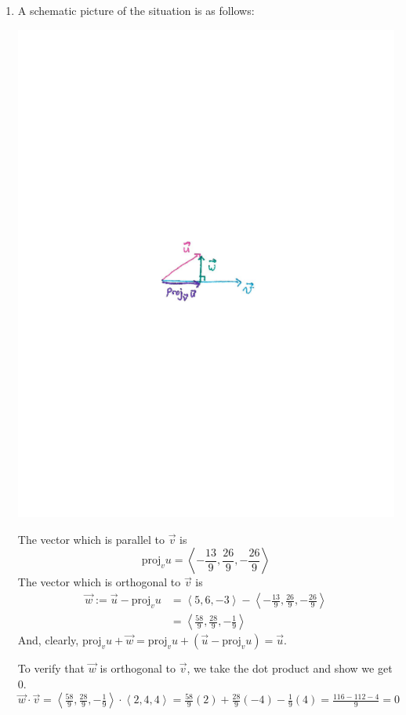 \documentclass[handout]{ximera}
\begin{document}
\begin{problem}
\begin{freeResponse}
\begin{enumerate}
	\item  A schematic picture of the situation is as follows:
		\begin{image}
		\includegraphics[trim= 170 350 170 350, scale=1]{Figure12-3-1.pdf}
		\end{image}
		
	The vector which is parallel to $\vec{v}$ is 
		\[
		\text{proj}_v u = \boxed{\left\langle - \frac{13}{9}, \frac{26}{9}, - \frac{26}{9} \right\rangle}
		\]
	The vector which is orthogonal to $\vec{v}$ is
		\begin{align*}
		\vec{w} := \vec{u} - \text{proj}_v u
		&= \left\langle 5,6,-3 \right\rangle - \left\langle - \frac{13}{9}, \frac{26}{9}, - \frac{26}{9} \right\rangle  \\
		&= \boxed{\left\langle \frac{58}{9}, \frac{28}{9}, - \frac{1}{9} \right\rangle}
		\end{align*}
	And, clearly, $\text{proj}_v u + \vec{w} = \text{proj}_v u + (\vec{u} - \text{proj}_v u) = \vec{u}$.  
	
	To verify that $\vec{w}$ is orthogonal to $\vec{v}$, we take the dot product and show we get 0. \\
	$\vec{w} \cdot \vec{v} = \left\langle \frac{58}{9}, \frac{28}{9}, - \frac{1}{9} \right\rangle \cdot \left\langle 2,4,4 \right\rangle  = \frac{58}{9} (2) + \frac{28}{9}  (-4) -  \frac{1}{9} (4) = \frac{116-112 -4}{9}=0$ 
	
	\end{enumerate}
	
	\end{freeResponse}

\end{problem}
\end{document}
